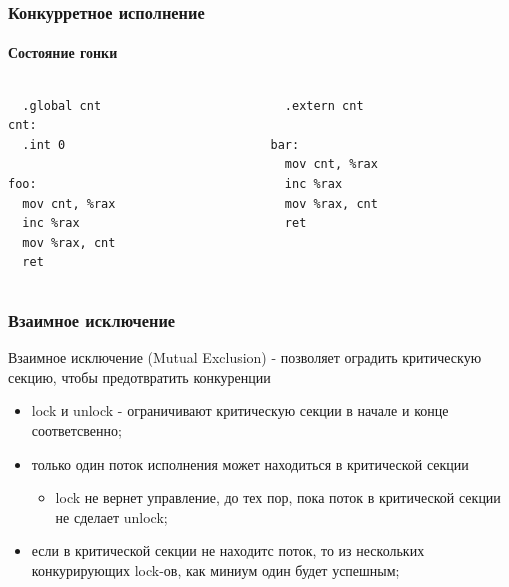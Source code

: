 \begin{frame}[fragile]
\frametitle{Конкурретное исполнение}
\framesubtitle{Состояние гонки}

\begin{columns}[T]
  \begin{column}{.45\linewidth}
    \begin{lstlisting}
  .global cnt
cnt:
  .int 0

foo:
  mov cnt, %rax
  inc %rax
  mov %rax, cnt
  ret
    \end{lstlisting}
  \end{column}
  \begin{column}{.45\linewidth}
    \begin{lstlisting}
  .extern cnt

bar:
  mov cnt, %rax
  inc %rax
  mov %rax, cnt
  ret
    \end{lstlisting}
  \end{column}
\end{columns}
\end{frame}

\begin{frame}
\frametitle{Взаимное исключение}

Взаимное исключение (Mutual Exclusion) - позволяет оградить критическую секцию,
чтобы предотвратить конкуренции

\begin{itemize}
  \item lock и unlock - ограничивают критическую секции в начале и конце
        соответсвенно;
  \item только один поток исполнения может находиться в критической секции
        \begin{itemize}
          \item lock не вернет управление, до тех пор, пока поток в критической
                секции не сделает unlock;
        \end{itemize}
  \item если в критической секции не находитс поток, то из нескольких
        конкурирующих lock-ов, как миниум один будет успешным;
\end{itemize}
\end{frame}

